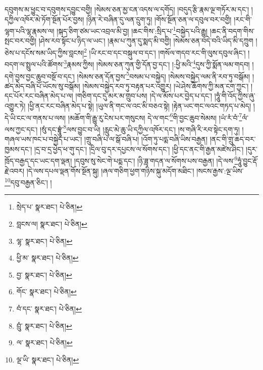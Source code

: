 དབུགས་མ་ཕྱུང་བ་དབུགས་དབྱུང་བགྱི། །སེམས་ཅན་མྱ་ངན་འདས་ལ་དགོད། །བདུད་རྩི་རྣམ་ལྔ་གཏོར་མ་དང་། །དཀྱིལ་འཁོར་མེ་ཏོག་སྔོན་པོར་བྱས། །ཉིན་རེ་བཞིན་དུ་ལན་དྲུག་ཏུ། །གོས་སྔོན་ཅན་ལ་དབུལ་བར་བགྱི། །རང་གི་ལྷག་པའི་ལྷ་རྣམས་ལ། །སྐད་ཅིག་ཙམ་ཡང་འབྲལ་མི་བྱ། །ཆང་གིས་:སྲིད་པ་\footnote{སྲེད་པ་  སྣར་ཐང་།  པེ་ཅིན། }བསྐྱེད་པའི་རྒྱུ། །ཆང་ནི་བདག་གིས་སྤང་བར་བགྱི། །ཤེས་རབ་སྟོང་པ་ཉིད་ལ་ཡང་། །རྣམ་པ་ཀུན་དུ་སྨད་མི་བགྱི། །སེམས་ཅན་བདེ་བའི་ཡིད་མི་དཀྲུག །ཅེས་པ་དངོས་སམ་ཡིད་ཀྱིས་བླངས།\footnote{བླངས་ལ།  སྣར་ཐང་།  པེ་ཅིན། } །ཡི་རང་བ་དང་བསྐུལ་བ་དང་། །གསོལ་གདབ་རང་གི་ལུས་དབུལ་ཞིང་། །བདག་ལ་སྤྲུལ་པའི་ཚོགས་\footnote{ལྷ་  སྣར་ཐང་།  པེ་ཅིན། }རྣམས་ཀྱིས། །སེམས་ཅན་ཀུན་གྱི་དོན་བྱ་དང་། །:ཕྱི་མའི་\footnote{ཕྱི་མ་  སྣར་ཐང་།  པེ་ཅིན། }དུས་ཀྱི་སྨོན་ལམ་གདབ། །དགེ་བྱས་བྱང་ཆུབ་བསྔོ་བ་དང་། །སེམས་ཅན་དོན་བྱས་\footnote{བྱ་  སྣར་ཐང་།  པེ་ཅིན། }བསམ་པ་བསྐྱེད། །སེམས་བསྐྱེད་ལམ་ནི་རབ་ཏུ་བསྒོམ། །ཚད་མེད་བཞི་པོ་ཡོངས་སུ་བསྒོམ། །སེམས་བསྐྱེད་རབ་ཏུ་བརྟན་པར་འགྱུར། །ཡེ་ཤེས་ཆོགས་ཀྱི་མན་ངག་ཀྱང་། །དང་པོར་རང་བཞིན་མེད་པ་ལ། །གཅིག་དང་དུ་མར་མ་གྲུབ་པས། །དེ་ལ་མོས་པར་བྱེད་པ་དང་། །ཧཱུཾ་གི་འོད་ཀྱིས་ཞུ་འགྱུར་ཏེ། །ཕྱི་ནང་རང་བཞིན་མེད་པ་སྟེ། །ཡུལ་ནི་གང་ལ་འང་མི་བཅའ་སྟེ། །རྟེན་ཡང་གང་ལའང་གཏད་པ་མེད། །དེ་ཡི་ངང་ལ་གནས་པ་ལས། །མཆོག་གི་རྒྱུ་རུ་ངེས་པར་གསུངས། དེ་ལ་གང་\footnote{གོང་  སྣར་ཐང་།  པེ་ཅིན། }གི་བྱང་ཆུབ་སེམས། །ཡཾ་རཾ་བཾ་\footnote{བཾ་དང་  སྣར་ཐང་།  པེ་ཅིན། }ལཾ་ལས་ཀྱང་དང་། །སུཾ་དང་བྷྲཱུཾ་\footnote{བྲུཾ་  སྣར་ཐང་།  པེ་ཅིན། }ལས་བྱུང་བ་ཡི། །རླུང་མེ་ཆུ་ཡི་དཀྱིལ་འཁོར་དང་། །ས་གཞི་རི་རབ་སྟེང་དག་ཏུ། །གཞལ་ཡས་ཁང་པ་བསྐྱེད་པ་ཡང་། །གྲུ་བཞི་པ་ལ་སྒོ་བཞི་པ། །འོག་ཏུ་པདྨ་བཞི་ཡིས་བརྒྱན། །ནང་གི་གྲུ་ཆད་བར་ཁྱམས་དང་། །དྲ་བ་དྲ་ཕྱེད་ཕ་གུ་དང་། །དྲིལ་བུ་དར་དཔྱངས་ལ་སོགས་དང་། །ཕྱི་དང་ནང་གི་རྒྱན་མཛེས་ཤིང་། །དུར་ཁྲོད་བརྒྱད་དང་ཡང་དག་ལྡན། །དབུས་སུ་སེང་གེ་པདྨ་དང་། །ཉི་ཟླ་གདན་ལ་སོགས་པས་བརྒྱན། །དེ་ལས་\footnote{ལ་  སྣར་ཐང་།  པེ་ཅིན། }ཧཱུཾ་བྱུང་རྡོ་རྗེ་འབར། །དེ་ལས་དཔལ་ལྡན་གོས་སྔོན་སྐུ། །ཞལ་གཅིག་ཕྱག་གཉིས་སྐུ་མདོག་མཐིང་། །སངས་རྒྱས་:ལྔ་ཡིས་\footnote{ལྔ་ཡི་  སྣར་ཐང་།  པེ་ཅིན། }དབུ་བརྒྱན་ཅིང་། །
